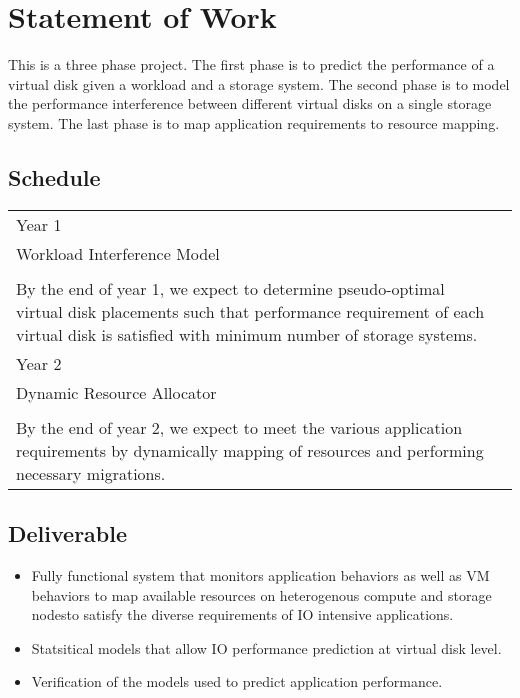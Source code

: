 \section{Statement of Work}
\label{plan}
%
This is a three phase project. The first phase is to predict the performance of a virtual disk given a workload and a storage system. The second phase is to model the performance interference between different virtual disks on a single storage system. The last phase is to map application requirements to resource mapping. 

\subsection{Schedule}
%
\bigskip
\begin{tabular}{l|l}
\hspace{.25in} Year 1 \hspace{.25in} & 
\begin{minipage}{5in}
  Virtual Disk Performance Model\\
	Workload Interference Model\\
  \\
  By the end of year 1, we expect to determine pseudo-optimal virtual disk placements such that performance requirement of each virtual disk is satisfied with minimum number of storage systems.
\medskip
\end{minipage}\\
\hline
\hspace{.25in} Year 2 & 
\begin{minipage}{5in}
  \medskip
  Application Performance Monitor\\
	Dynamic Resource Allocator\\
  \\
  By the end of year 2, we expect to meet the various application requirements by dynamically mapping of resources and performing necessary migrations. 
\medskip
\end{minipage}\\
\end{tabular}

\subsection{Deliverable} 
\label{deliverable} 
%
\begin{itemize}
\item Fully functional system that monitors application behaviors as well as VM behaviors to map available resources on heterogenous compute and storage nodesto satisfy the diverse requirements of IO intensive applications. 
\item Statsitical models that allow IO performance prediction at virtual disk level. 
\item Verification of the models used to predict application performance.
\end{itemize}
